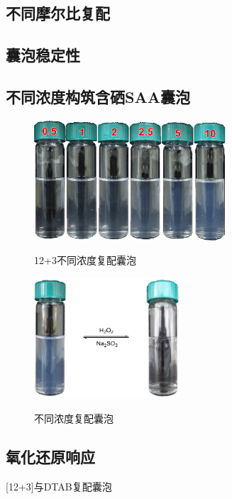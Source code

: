 \documentclass[bachelor,fandolfonts,replaceperiod]{jnuthesis} %
\begin{document}
    \subsection{不同摩尔比复配}
    
    \subsection{囊泡稳定性}
    
    \subsection{不同浓度构筑含硒SAA囊泡}

    \begin{figure}[htbp]
        \centering
        \includegraphics[height=4.5cm]{figure/123concentration.png}\\
        \caption{12+3不同浓度复配囊泡}\label{fig:vesicle-concentration}
    \end{figure}

    \begin{figure}[htbp]
        \centering
        \includegraphics[height=4.5cm]{figure/redox.pdf}\\
        \caption{不同浓度复配囊泡}\label{fig:vesicle-redox}
    \end{figure}

    \subsection{氧化还原响应}
    
    
    [12+3]与DTAB复配囊泡
    
\end{document}
